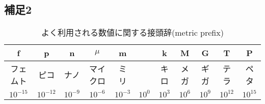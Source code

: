 \documentclass[10pt,a4j]{jarticle}
\begin{document}
\subsection{補足2}
\begin{table}[h]
\begin{center}
\caption{よく利用される数値に関する接頭辞(metric prefix)}
\label{tbl:prefix}
\begin{tabular}{c|c|c|c|c|c|c|c|c|c|c}
f & p & n & $\mu$ & m & & k & M & G & T & P \\
\hline
フェムト & ピコ& ナノ & マイクロ & ミリ & & キロ & メガ& ギガ& テラ & ペタ\\
\hline
$10^{-15}$ &
$10^{-12}$&
$10^{-9}$ &
$10^{-6}$ &
$10^{-3}$ &
$10^0$ &
$10^3$ &
$10^6$ &
$10^9$ &
$10^{12}$&
$10^{15}$ 
\end{tabular}
\end{center}
\end{table}
\end{document}
